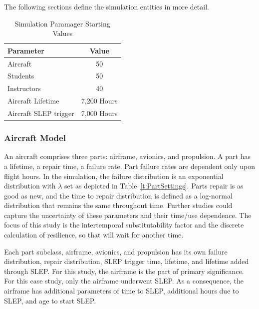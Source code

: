 \documentclass[preprint,12pt]{elsarticle}
\begin{document}
The following sections define the simulation entities in more detail.

\begin{table}[h]
\begin{center}
    \caption{Simulation Paramager Starting Values }
  \label{t:StartingValues}
    \begin{tabular}{l c }
      \hline
      \hline
      \textbf{Parameter} & \textbf{Value} \\
      \hline
      Aircraft & 50 \\
      Students & 50 \\
      Instructors & 40 \\
      Aircraft Lifetime & 7,200 Hours \\
      Aircraft SLEP trigger & 7,000 Hours \\
      \hline
    \end{tabular}
    \end{center}
\end{table}

\subsubsection{Aircraft Model}
An aircraft comprises three parts: airframe, avionics, and
propulsion. A part has a lifetime, a repair time, a failure rate. Part
failure rates are dependent only upon flight hours. In the simulation,
the failure distribution is an exponential distribution with $\lambda$
set as depicted in Table~\ref{t:PartSettings}. Parts repair is
as good as new, and the time to repair distribution is defined as a
log-normal distribution that remains the same throughout time. Further
studies could capture the uncertainty of these parameters and their
time/use dependence. The focus of this study is the intertemporal
substitutability factor and the discrete calculation of resilience, so
that will wait for another time.

Each part subclass, airframe, avionics, and propulsion has its own
failure distribution, repair distribution, SLEP trigger time,
lifetime, and lifetime added through SLEP. For this study, the
airframe is the part of primary significance. For  this case study,
only the airframe underwent SLEP. As a consequence, the airframe has
additional parameters of time to SLEP, additional  hours due to SLEP,
and age to start SLEP.
\end{document}

